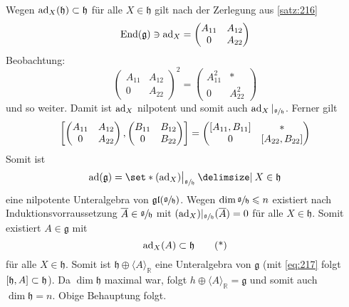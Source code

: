 \begin{beweis}
	Wegen $\ad_X(\mathfrak{h}) \subset \mathfrak{h}$ für alle $X \in \mathfrak{h}$ gilt nach der Zerlegung aus \autoref{satz:216}
	\[
		\End(\mathfrak{g}) \ni \ad_X = \begin{pmatrix}
			A_{11} & A_{12} \\ 0 & A_{22}
		\end{pmatrix}
	\]
	Beobachtung:
	\[
		\begin{pmatrix}
			A_{11} & A_{12} \\ 0 & A_{22}
		\end{pmatrix}^2 = \begin{pmatrix}
			A_{11}^2 & * \\ 0 & A_{22}^2
		\end{pmatrix}
	\]
	und so weiter. 
	Damit ist $\ad_X$ nilpotent und somit auch $\ad_X|_{\sfrac{\mathfrak{g}}{\mathfrak{h}}}$.
	Ferner gilt
	\[
		\benbrace*{\begin{pmatrix}
			A_{11} & A_{12} \\ 0 & A_{22}
		\end{pmatrix}, \begin{pmatrix}
			B_{11} & B_{12} \\ 0 & B_{22}
		\end{pmatrix}} = \begin{pmatrix}
			\benbrace*{A_{11},B_{11}} & * \\ 0 & \benbrace*{A_{22},B_{22}}
		\end{pmatrix}
	\]
	Somit ist 
	\[
		\ad(\mathfrak{g}) = \set*{(\ad_X)\big|_{\sfrac{\mathfrak{g}}{\mathfrak{h}}} \given X \in \mathfrak{h}}
	\]
	eine nilpotente Unteralgebra von $\mathfrak{gl}(\sfrac{\mathfrak{g}}{\mathfrak{h}})$.
	Wegen $\dim \sfrac{\mathfrak{g}}{\mathfrak{h}} \le n$ existiert nach Induktionsvorraussetzung $\overline{A} \in \sfrac{\mathfrak{g}}{\mathfrak{h}}$ mit $(\ad_X)|_{\sfrac{\mathfrak{g}}{\mathfrak{h}}}(\overline{A})=0$ für alle $X \in \mathfrak{h}$.
	Somit existiert $A \in \mathfrak{g}$ mit 
	\begin{equation}
		\ad_X(A) \subset \mathfrak{h} \label{eq:217} \tag{*}
	\end{equation}
	für alle $X \in \mathfrak{h}$.
	Somit ist $\mathfrak{h} \oplus \langle A \rangle_\mathbb{R}$ eine Unteralgebra von $\mathfrak{g}$ (mit \eqref{eq:217} folgt $\benbrace*{\mathfrak{h},A}\subset \mathfrak{h}$).
	Da $\dim \mathfrak{h}$ maximal war, folgt $h \oplus \langle A \rangle_\mathbb{R} = \mathfrak{g}$ und somit auch $\dim \mathfrak{h}=n$.
	Obige Behauptung folgt.
	

\end{beweis}
